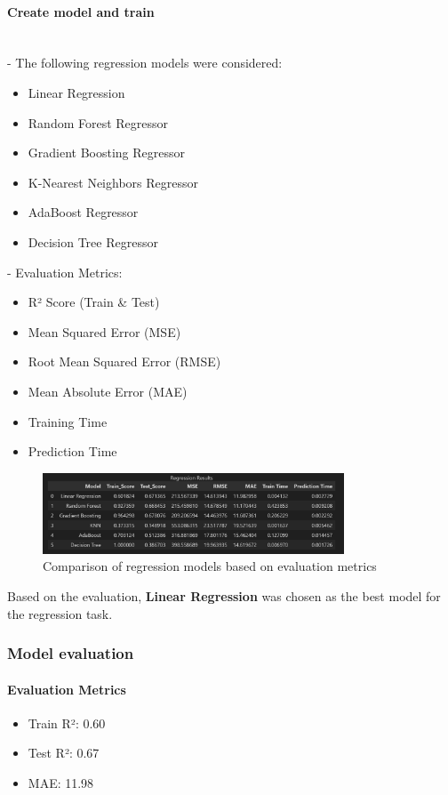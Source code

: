 \documentclass[12pt,a4paper]{report}
\begin{document}
\paragraph{Create model and train}~\\
\noindent - The following regression models were considered:
\begin{itemize}
    \item Linear Regression
    \item Random Forest Regressor
    \item Gradient Boosting Regressor
    \item K-Nearest Neighbors Regressor
    \item AdaBoost Regressor
    \item Decision Tree Regressor
\end{itemize}

- Evaluation Metrics:
\begin{itemize}
    \item R² Score (Train \& Test)
    \item Mean Squared Error (MSE)
    \item Root Mean Squared Error (RMSE)
    \item Mean Absolute Error (MAE)
    \item Training Time
    \item Prediction Time
\end{itemize}

\begin{figure}[H]
    \centering
    \includegraphics[width=0.8\textwidth]{media/image15.png}
    \caption{Comparison of regression models based on evaluation metrics}
    \label{fig:regression-comparison}
\end{figure}

Based on the evaluation, \textbf{Linear Regression} was chosen as the best model for the regression task.

\subsubsection{Model evaluation}
\paragraph{Evaluation Metrics}
\begin{itemize}
    \item Train R²: 0.60
    \item Test R²: 0.67
    \item MAE: 11.98
\end{itemize}
\end{document}
